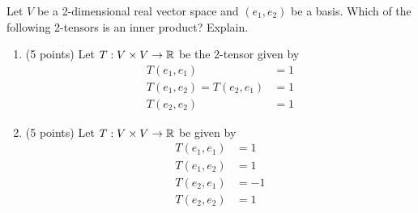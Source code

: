 \begin{exercise}
  \label{ex:hw07:tensor-inner-products}
  Let \(V\) be a 2-dimensional real vector space and \((e_1,e_2)\)
  be a basis. Which of the following 2-tensors is an inner product?
  Explain.
  \begin{enumerate}[{2}.1.][2]
    \item (5 points) Let \(T:V\times V\to\mathbb{R}\) be the 2-tensor given by
      \[
        \begin{aligned}
          T(e_1,e_1)&=1\\
          T(e_1,e_2)=T(e_2,e_1)&=1\\
          T(e_2,e_2)&=1
        \end{aligned}
      \]
    \item (5 points) Let \(T:V\times V\to\mathbb{R}\) be given by
      \[
        \begin{aligned}
          T(e_1,e_1)&=1\\
          T(e_1,e_2)&=1\\
          T(e_2,e_1)&=-1\\
          T(e_2,e_2)&=1
        \end{aligned}
      \]
  \end{enumerate}
\end{exercise}
